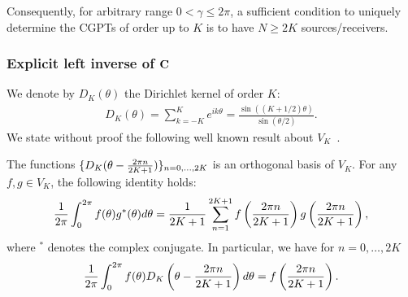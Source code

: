 Consequently, for arbitrary range $0<\gamma\leq 2\pi$, a
sufficient condition to uniquely determine the CGPTs of order up
to $K$ is to have $N \geq 2K$ sources/receivers.

\subsubsection{Explicit left inverse of $\mathbf{C}$}
\label{sec:explicit_linv_C}

We denote by $D_K(\theta)$ the Dirichlet kernel of order $K$:
\begin{align}
  \label{eq:Dirichlet_kernel}
  D_K(\theta)=\sum_{k=-K}^K e^{ik\theta} =
  \frac{\sin((K+1/2)\theta)}{\sin(\theta/2)}.
\end{align}
We state without proof the following well known result about
$V_K$~\cite{zygmund_trigonometric_1988}.
\begin{lemma}
\label{lemma:VK_innerprod_sum} The functions
$\{ D_K(\theta-\frac{2\pi n}{2K+1}) \}_{n=0,\ldots, 2K}$ is an
orthogonal basis of $V_K$. For any $f,g\in V_{K}$, the following
identity holds:
\begin{align}
  \label{eq:VK_innerprod_sum}
  \frac {1}{2\pi} \int_0^{2\pi} f(\theta) g^*(\theta)d\theta = \frac 1 {2K+1}\sum_{n=1}^{2K+1}f\left( \frac {2\pi
      n}{2K+1} \right)g\left( \frac {2\pi n}{2K+1} \right),
\end{align}
where $^*$ denotes the complex conjugate. In particular,  we have
for $n=0, \ldots, 2K$
\begin{align}
  \label{eq:VK_dirichlet_coeff}
  \frac {1}{2\pi} \int_0^{2\pi} f(\theta)D_K\left( \theta-\frac {2\pi n}{2K+1} \right)
  d\theta = f\left( \frac {2\pi n}{2K+1} \right).
\end{align}
\end{lemma}

